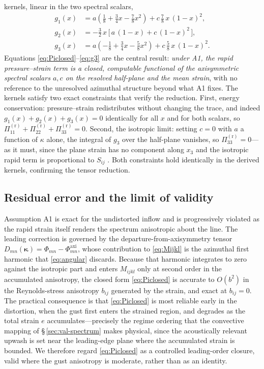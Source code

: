 \documentclass[lineno]{JFM-FLM_Au}
\begin{document}
kernels, linear in the two spectral scalars,
\begin{align}
  g_{1}(x) &= a\!\left(\tfrac18 + \tfrac34 x - \tfrac78 x^2\right)
            + c\,\tfrac78\,x\,(1-x)^2, \label{eq:g1}\\[2pt]
  g_{2}(x) &= -\tfrac32\,x\,\bigl[\,a\,(1-x) + c\,(1-x)^2\,\bigr],
            \label{eq:g2}\\[2pt]
  g_{3}(x) &= a\!\left(-\tfrac18 + \tfrac34 x - \tfrac58 x^2\right)
            + c\,\tfrac58\,x\,(1-x)^2. \label{eq:g3}
\end{align}
Equations \eqref{eq:Piclosed}--\eqref{eq:g3} are the central result:
\emph{under A1, the rapid pressure--strain term is a closed, computable
functional of the axisymmetric spectral scalars $a,c$ on the resolved
half-plane and the mean strain}, with no reference to the unresolved azimuthal
structure beyond what A1 fixes. The kernels satisfy two exact constraints that
verify the reduction. First, energy conservation: pressure--strain
redistributes without changing the trace, and indeed
$g_1(x)+g_2(x)+g_3(x)=0$ identically for all $x$ and for both scalars, so
$\Pi^{(\mathrm r)}_{11}+\Pi^{(\mathrm r)}_{22}+\Pi^{(\mathrm r)}_{33}=0$.
Second, the isotropic limit: setting $c=0$ with $a$ a function of $\kappa$
alone, the integral of $g_3$ over the half-plane vanishes, so
$\Pi^{(\mathrm r)}_{33}=0$---as it must, since the plane strain has no
component along $x_3$ and the isotropic rapid term is proportional to $S_{ij}$
\citep{Crow1968}. Both constraints hold identically in the derived kernels,
confirming the tensor reduction.

\subsection{Residual error and the limit of validity}\label{sec:residual}

Assumption A1 is exact for the undistorted inflow and is progressively
violated as the rapid strain itself renders the spectrum anisotropic about the
line. The leading correction is governed by the departure-from-axisymmetry
tensor $D_{mn}(\boldsymbol{\kappa})
=\Phi_{mn}-\Phi^{\mathrm{axi}}_{mn}$, whose contribution to
\eqref{eq:Mijkl} is the azimuthal first harmonic that \eqref{eq:angular}
discards. Because that harmonic integrates to zero against the isotropic part
and enters $M_{ijkl}$ only at second order in the accumulated anisotropy, the
closed form \eqref{eq:Piclosed} is accurate to $O(b^2)$ in the Reynolds-stress
anisotropy $b_{ij}$ generated by the strain, and exact at $b_{ij}=0$. The
practical consequence is that \eqref{eq:Piclosed} is most reliable early in
the distortion, when the gust first enters the strained region, and degrades
as the total strain $e$ accumulates---precisely the regime ordering that the
convective mapping of \S\,\ref{sec:val-spectrum} makes physical, since the
acoustically relevant upwash is set near the leading-edge plane where the
accumulated strain is bounded. We therefore regard \eqref{eq:Piclosed} as a
controlled leading-order closure, valid where the gust anisotropy is moderate,
rather than as an identity.
\end{document}

